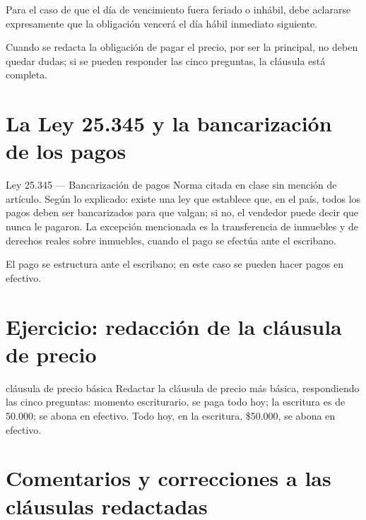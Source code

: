 \documentclass[12pt,oneside]{book}
\begin{document}
Para el caso de que el d\'ia de vencimiento fuera feriado o inh\'abil, debe aclararse expresamente que la obligaci\'on vencer\'a el d\'ia h\'abil inmediato siguiente.

\begin{important}
Cuando se redacta la obligaci\'on de pagar el precio, por ser la principal, no deben quedar dudas; si se pueden responder las cinco preguntas, la cl\'ausula est\'a completa.
\end{important}

\section{La Ley 25.345 y la bancarizaci\'on de los pagos}

\begin{norma}{Ley 25.345 --- Bancarizaci\'on de pagos}
Norma citada en clase sin mención de art\'iculo. Seg\'un lo explicado: existe una ley que establece que, en el pa\'is, todos los pagos deben ser bancarizados para que valgan; si no, el vendedor puede decir que nunca le pagaron. La excepci\'on mencionada es la transferencia de inmuebles y de derechos reales sobre inmuebles, cuando el pago se efect\'ua ante el escribano.
\end{norma}

El pago se estructura ante el escribano; en este caso se pueden hacer pagos en efectivo.


\section{Ejercicio: redacci\'on de la cl\'ausula de precio}

\begin{exercise}{cl\'ausula de precio b\'asica}
Redactar la cl\'ausula de precio m\'as b\'asica, respondiendo las cinco preguntas: momento escriturario, se paga todo hoy; la escritura es de 50.000; se abona en efectivo. Todo hoy, en la escritura, \$50.000, se abona en efectivo.
\end{exercise}

\section{Comentarios y correcciones a las cl\'ausulas redactadas}
\end{document}
